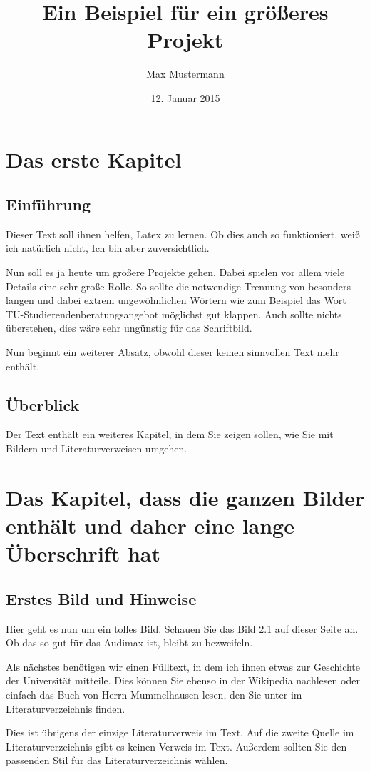 \documentclass[12pt,a4paper, bibliography=totoc]{scrbook}
\title{Ein Beispiel für ein größeres Projekt}
\author{Max Mustermann}
\date{12. Januar 2015}
\begin{document}
\maketitle
\tableofcontents
\listoffigures
\chapter{Das erste Kapitel}
\section*{Einführung}
Dieser Text soll ihnen helfen, Latex zu lernen. Ob dies auch so funktioniert,
weiß ich natürlich nicht, Ich bin aber zuversichtlich. 

Nun soll es ja heute um größere Projekte gehen. Dabei spielen vor allem viele
Details eine sehr große Rolle. So sollte die notwendige Trennung von besonders
langen und dabei extrem ungewöhnlichen Wörtern wie zum Beispiel das Wort TU-Studierendenberatungs\-angebot
möglichst gut klappen. Auch sollte nichts überstehen, dies wäre sehr ungünstig für das Schriftbild.

Nun beginnt ein weiterer Absatz, obwohl dieser keinen sinnvollen Text mehr enthält.
\section*{Überblick}
Der Text enthält ein weiteres Kapitel, in dem Sie zeigen sollen, wie Sie mit Bildern und
Literaturverweisen umgehen.
\chapter[Bilder]{Das Kapitel, dass die ganzen Bilder enthält und daher eine lange Überschrift hat}
\section{Erstes Bild und Hinweise}
Hier geht es nun um ein tolles Bild. Schauen Sie das Bild 2.1 auf dieser Seite an. Ob das so gut für das Audimax ist, bleibt zu bezweifeln.

Als nächstes benötigen wir einen Fülltext, in dem ich ihnen etwas zur Geschichte der Universität mitteile. Dies können Sie ebenso in der Wikipedia nachlesen oder einfach das Buch von Herrn Mummelhausen lesen, den Sie unter \cite{mummel} im Literaturverzeichnis finden.

Dies ist übrigens der einzige Literaturverweis im Text. Auf die zweite
Quelle im Literaturverzeichnis gibt es keinen Verweis im Text. Außerdem sollten Sie den passenden Stil für das Literaturverzeichnis wählen.
\end{document}
